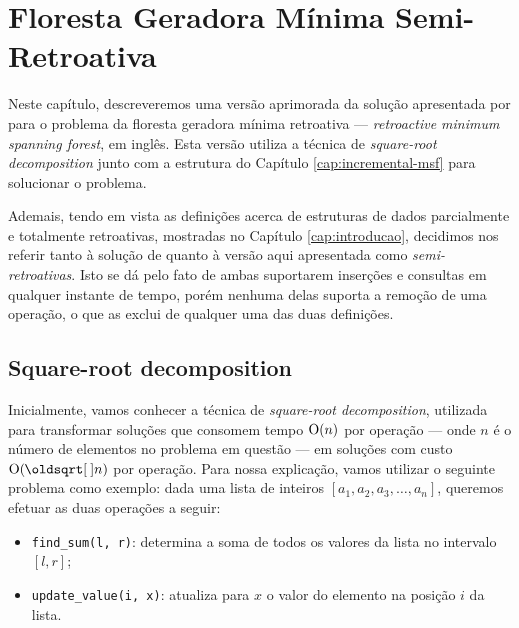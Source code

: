 
\chapter{Floresta Geradora Mínima Semi-Retroativa}
\label{cap:retroactive-msf}

Neste capítulo, descreveremos uma versão aprimorada da solução apresentada por \citet{10.1093/comjnl/bxaa135} para o problema da floresta geradora mínima retroativa --- \emph{retroactive minimum spanning forest}, em inglês. Esta versão utiliza a técnica de \emph{square-root decomposition} junto com a estrutura do Capítulo \ref{cap:incremental-msf} para solucionar o problema.

Ademais, tendo em vista as definições acerca de estruturas de dados parcialmente e totalmente retroativas, mostradas no Capítulo \ref{cap:introducao}, decidimos nos referir tanto à solução de \citet{10.1093/comjnl/bxaa135} quanto à versão aqui apresentada como \emph{semi-retroativas}. Isto se dá pelo fato de ambas suportarem inserções e consultas em qualquer instante de tempo, porém nenhuma delas suporta a remoção de uma operação, o que as exclui de qualquer uma das duas definições.

\section{Square-root decomposition}
\label{sec:sqrt-decomp}

\nocite{sqrt-decomp}

Inicialmente, vamos conhecer a técnica de \emph{square-root decomposition}, utilizada para transformar soluções que consomem tempo $\mathrm{O}(n)$ por operação --- onde $n$ é o número de elementos no problema em questão --- em soluções com custo $\Oh(\sqrt{n})$ por operação. Para nossa explicação, vamos utilizar o seguinte problema como exemplo: dada uma lista de inteiros $ [ a_1, a_2, a_3, \dots, a_n ] $, queremos efetuar as duas operações a seguir:

\begin{itemize}
    \item \texttt{find\_sum(l, r)}: determina a soma de todos os valores da lista no intervalo $[l,r]$;
    \item \texttt{update\_value(i, x)}: atualiza para $x$ o valor do elemento na posição $i$ da lista.
\end{itemize}

